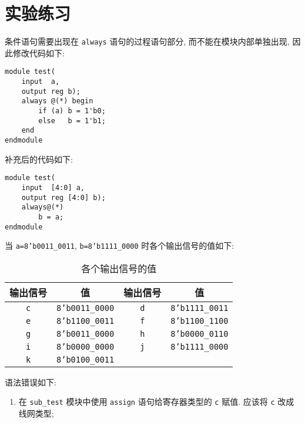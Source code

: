 \documentclass[UTF8,fontset=fandol]{ctexart}
\begin{document}
\section*{实验练习}
\begin{ExQuestions}
  \question 条件语句需要出现在 \texttt{always} 语句的过程语句部分, 而不能在模块内部单独出现, 因此修改代码如下:
\begin{lstlisting}[style = verilogstyle, caption = {修改后的题目 1.}, label = {Code.1}]
module test(
    input  a,
    output reg b);
    always @(*) begin
        if (a) b = 1'b0;
        else   b = 1'b1;
    end
endmodule
\end{lstlisting}
    \question 补充后的代码如下:
\begin{lstlisting}[style = verilogstyle, caption = {补充完毕的题目 2.}, label = {Code.2}]
module test(
    input  [4:0] a,
    output reg [4:0] b);
    always@(*)
        b = a;
endmodule
\end{lstlisting}
\newpage
    \question 当 \texttt{a=8'b0011\_0011}, \texttt{b=8'b1111\_0000} 时各个输出信号的值如下:
    \begin{table}[!ht]
        \vspace*{-1em}
        \centering
        \caption{各个输出信号的值}
        \label{Tab.1}
        \begin{tabular}{cccc}
            \toprule
            \textbf{输出信号} & \textbf{值} & \textbf{输出信号} & \textbf{值} \\
            \midrule
            \texttt{c} & \texttt{8'b0011\_0000} & \texttt{d} & \texttt{8'b1111\_0011} \\
            \texttt{e} & \texttt{8'b1100\_0011} & \texttt{f} & \texttt{8'b1100\_1100} \\
            \texttt{g} & \texttt{8'b0011\_0000} & \texttt{h} & \texttt{8'b0000\_0110} \\
            \texttt{i} & \texttt{8'b0000\_0000} & \texttt{j} & \texttt{8'b1111\_0000} \\
            \texttt{k} & \texttt{8'b0100\_0011} & &\\
            \bottomrule
        \end{tabular}
    \end{table}
    \question 语法错误如下:
    \begin{enumerate}
        \item 在 \texttt{sub\_test} 模块中使用 \texttt{assign} 语句给寄存器类型的 \texttt{c} 赋值. 应该将 \texttt{c} 改成线网类型;

\end{enumerate}
\end{ExQuestions}
\end{document}
